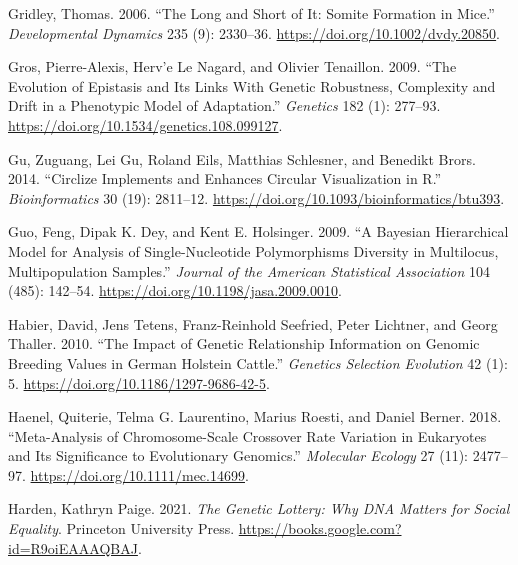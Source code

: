 \documentclass[
]{book}
\newlength{\cslhangindent}
\newlength{\cslentryspacingunit} %
\newenvironment{CSLReferences}[2] %
 {%
  \setlength{\parindent}{0pt}
  \ifodd #1
  \let\oldpar\par
  \def\par{\hangindent=\cslhangindent\oldpar}
  \fi
  \setlength{\parskip}{#2\cslentryspacingunit}
 }%
 {}
\begin{document}
\begin{CSLReferences}{1}{0}
\leavevmode{}%
Gridley, Thomas. 2006. {``The Long and Short of It: {Somite} Formation in Mice.''} \emph{Developmental Dynamics} 235 (9): 2330--36. \url{https://doi.org/10.1002/dvdy.20850}.

\leavevmode{}%
Gros, Pierre-Alexis, Herv'e Le Nagard, and Olivier Tenaillon. 2009. {``The {Evolution} of {Epistasis} and {Its Links With Genetic Robustness}, {Complexity} and {Drift} in a {Phenotypic Model} of {Adaptation}.''} \emph{Genetics} 182 (1): 277--93. \url{https://doi.org/10.1534/genetics.108.099127}.

\leavevmode{}%
Gu, Zuguang, Lei Gu, Roland Eils, Matthias Schlesner, and Benedikt Brors. 2014. {``Circlize Implements and Enhances Circular Visualization in {R}.''} \emph{Bioinformatics} 30 (19): 2811--12. \url{https://doi.org/10.1093/bioinformatics/btu393}.

\leavevmode{}%
Guo, Feng, Dipak K. Dey, and Kent E. Holsinger. 2009. {``A {Bayesian Hierarchical Model} for {Analysis} of {Single-Nucleotide Polymorphisms Diversity} in {Multilocus}, {Multipopulation Samples}.''} \emph{Journal of the American Statistical Association} 104 (485): 142--54. \url{https://doi.org/10.1198/jasa.2009.0010}.

\leavevmode{}%
Habier, David, Jens Tetens, Franz-Reinhold Seefried, Peter Lichtner, and Georg Thaller. 2010. {``The Impact of Genetic Relationship Information on Genomic Breeding Values in {German Holstein} Cattle.''} \emph{Genetics Selection Evolution} 42 (1): 5. \url{https://doi.org/10.1186/1297-9686-42-5}.

\leavevmode{}%
Haenel, Quiterie, Telma G. Laurentino, Marius Roesti, and Daniel Berner. 2018. {``Meta-Analysis of Chromosome-Scale Crossover Rate Variation in Eukaryotes and Its Significance to Evolutionary Genomics.''} \emph{Molecular Ecology} 27 (11): 2477--97. \url{https://doi.org/10.1111/mec.14699}.

\leavevmode{}%
Harden, Kathryn Paige. 2021. \emph{The {Genetic Lottery}: {Why DNA Matters} for {Social Equality}}. {Princeton University Press}. \url{https://books.google.com?id=R9oiEAAAQBAJ}.


\end{CSLReferences}
\end{document}
